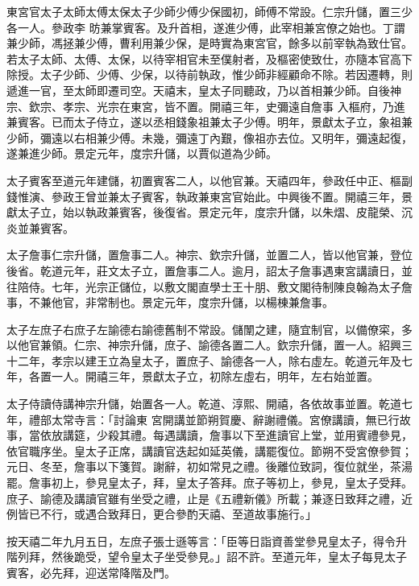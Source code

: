 \begin{pinyinscope}
 東宮官太子太師太傅太保太子少師少傅少保國初，師傅不常設。仁宗升儲，置三少各一人。參政李
 昉兼掌賓客。及升首相，遂進少傅，此宰相兼宮僚之始也。丁謂兼少師，馮拯兼少傅，曹利用兼少保，是時實為東宮官，餘多以前宰執為致仕官。若太子太師、太傅、太保，以待宰相官未至僕射者，及樞密使致仕，亦隨本官高下除授。太子少師、少傅、少保，以待前執政，惟少師非經顧命不除。若因遷轉，則遞進一官，至太師即遷司空。天禧末，皇太子同聽政，乃以首相兼少師。自後神宗、欽宗、孝宗、光宗在東宮，皆不置。開禧三年，史彌遠自詹事
 入樞府，乃進兼賓客。已而太子侍立，遂以丞相錢象祖兼太子少傅。明年，景獻太子立，象祖兼少師，彌遠以右相兼少傅。未幾，彌遠丁內艱，像祖亦去位。又明年，彌遠起復，遂兼進少師。景定元年，度宗升儲，以賈似道為少師。



 太子賓客至道元年建儲，初置賓客二人，以他官兼。天禧四年，參政任中正、樞副錢惟演、參政王曾並兼太子賓客，執政兼東宮官始此。中興後不置。開禧三年，景
 獻太子立，始以執政兼賓客，後復省。景定元年，度宗升儲，以朱熠、皮龍榮、沉炎並兼賓客。



 太子詹事仁宗升儲，置詹事二人。神宗、欽宗升儲，並置二人，皆以他官兼，登位後省。乾道元年，莊文太子立，置詹事二人。逾月，詔太子詹事遇東宮講讀日，並往陪侍。七年，光宗正儲位，以敷文閣直學士王十朋、敷文閣待制陳良翰為太子詹事，不兼他官，非常制也。景定元年，度宗升儲，以楊棟兼詹事。



 太子左庶子右庶子左諭德右諭德舊制不常設。儲闈之建，隨宜制官，以備僚寀，多以他官兼領。仁宗、神宗升儲，庶子、諭德各置二人。欽宗升儲，置一人。紹興三十二年，孝宗以建王立為皇太子，置庶子、諭德各一人，除右虛左。乾道元年及七年，各置一人。開禧三年，景獻太子立，初除左虛右，明年，左右始並置。



 太子侍讀侍講神宗升儲，始置各一人。乾道、淳熙、開禧，各依故事並置。乾道七年，禮部太常寺言：「討論東
 宮開講並節朔賀慶、辭謝禮儀。宮僚講讀，無已行故事，當依放講筵，少殺其禮。每遇講讀，詹事以下至進讀官上堂，並用賓禮參見，依官職序坐。皇太子正席，講讀官迭起如延英儀，講罷復位。節朔不受宮僚參賀；元日、冬至，詹事以下箋賀。謝辭，初如常見之禮。後離位致詞，復位就坐，茶湯罷。詹事初上，參見皇太子，拜，皇太子答拜。庶子等初上，參見，皇太子受拜。庶子、諭德及講讀官雖有坐受之禮，止是《五禮新儀》所載；兼逐日致拜之禮，近
 例皆已不行，或遇合致拜日，更合參酌天禧、至道故事施行。」



 按天禧二年九月五日，左庶子張士遜等言：「臣等日詣資善堂參見皇太子，得令升階列拜，然後跪受，望令皇太子坐受參見。」詔不許。至道元年，皇太子每見太子賓客，必先拜，迎送常降階及門。




\end{pinyinscope}
